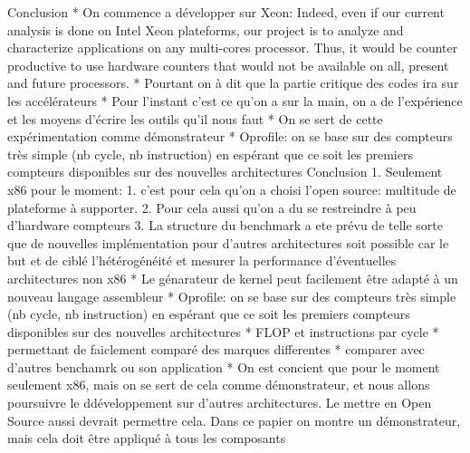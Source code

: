 Conclusion
	* On commence a développer sur Xeon:
		Indeed, even if our current analysis is done on Intel Xeon plateforms, our project is to analyze and characterize applications on any multi-cores processor. Thus, it would be counter productive to use hardware counters that would not be available on all, present and future processors.
		    * Pourtant on à dit que la partie critique des codes ira sur les accélérateurs
		    * Pour l’instant c’est ce qu’on a sur la main, on a de l’expérience et les moyens d’écrire les outils qu’il nous faut
		    * On se sert de cette expérimentation comme démonstrateur
		        * Oprofile: on se base sur des compteurs très simple (nb cycle, nb instruction) en espérant que ce soit les premiers compteurs disponibles sur des nouvelles architectures
	Conclusion
		1. Seulement x86 pour le moment: 
			    1. c’est pour cela qu’on a choisi l’open source: multitude de plateforme à supporter. 
			    2. Pour cela aussi qu’on a du se restreindre à peu d’hardware compteurs
			    3. La structure du benchmark a ete prévu de telle sorte que de nouvelles implémentation pour d’autres architectures soit possible car le but et de ciblé l’hétérogénéité et mesurer la performance d’éventuelles architectures non x86
				        * Le génarateur de kernel peut facilement être adapté à un nouveau langage assembleur
				        * Oprofile: on se base sur des compteurs très simple (nb cycle, nb instruction) en espérant que ce soit les premiers compteurs disponibles sur des nouvelles architectures
			    * FLOP et instructions par cycle
				        * permettant de faiclement comparé des marques differentes
				        * comparer avec d’autres benchamrk ou son application
			* On est concient que pour le moment seulement x86, mais on se sert de cela comme démonstrateur, et nous allons poursuivre le ddéveloppement sur d’autres architectures. Le mettre en Open Source aussi devrait permettre cela.
		Dans ce papier on montre un démonstrateur, mais cela doit être appliqué à tous les composants
